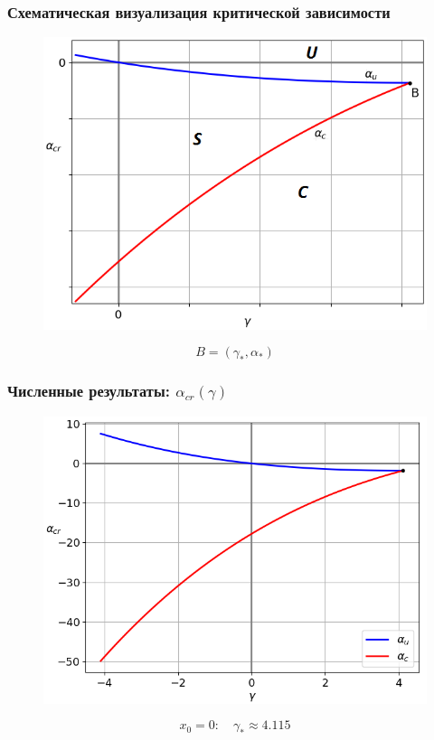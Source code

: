 \documentclass[fullscreen=true, unicode, bookmarks=false]{beamer}
\begin{document}
\begin{frame}
\frametitle{ Схематическая визуализация критической зависимости }

\begin{figure} 
\includegraphics[scale=0.55]{scheme.png}  
\end{figure}

$$ B=(\gamma_*, \alpha_*) $$

\end{frame}

\begin{frame}
\frametitle{ Численные результаты: $ \alpha_{cr}(\gamma) $ }

\begin{figure} 
\includegraphics[scale=0.55]{alphas_0.png}  
\end{figure}

$$ x_0 = 0: \quad \gamma_* \approx 4.115 $$

\end{frame}
\end{document}
